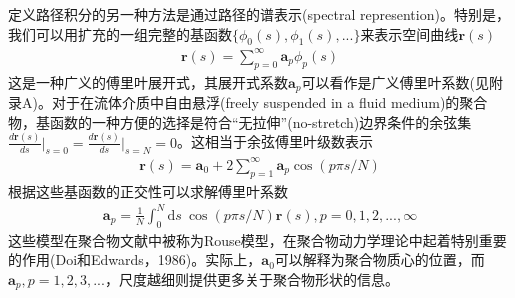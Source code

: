 定义路径积分的另一种方法是通过路径的谱表示(spectral represention)。特别是，我们可以用扩充的一组完整的基函数$\lbrace \phi _0(s),\phi _1(s),... \rbrace$来表示空间曲线$\mathbf{r}(s)$
\begin{gather}
\mathbf{r}(s)=\sum_{p=0}^{\infty} \mathbf{a}_p \phi _p(s)
\end{gather}
这是一种广义的傅里叶展开式，其展开式系数$\mathbf{a}_p$可以看作是广义傅里叶系数(见附录A)。对于在流体介质中自由悬浮(freely suspended in a fluid medium)的聚合物，基函数的一种方便的选择是符合“无拉伸”(no-stretch)边界条件的余弦集$\frac{d\mathbf{r}(s)}{ds}\vert _{s=0}=\frac{d\mathbf{r}(s)}{ds}\vert _{s=N}=0$。这相当于余弦傅里叶级数表示
\begin{gather}
\mathbf{r}(s)=\mathbf{a}_0+2\sum_{p=1}^{\infty} \mathbf{a}_p \cos(p\pi s/N)
\end{gather}
根据这些基函数的正交性可以求解傅里叶系数
\begin{gather}
\mathbf{a}_p=\frac{1}{N}\int_{0}^{N}  \mathrm{d}s~\cos(p\pi s/N)\mathbf{r}(s),p=0,1,2,...,\infty
\end{gather}
这些模型在聚合物文献中被称为Rouse模型，在聚合物动力学理论中起着特别重要的作用(Doi和Edwards，1986)。实际上，$\mathbf{a}_0$可以解释为聚合物质心的位置，而$\mathbf{a}_p,p=1,2,3,...$，尺度越细则提供更多关于聚合物形状的信息。

